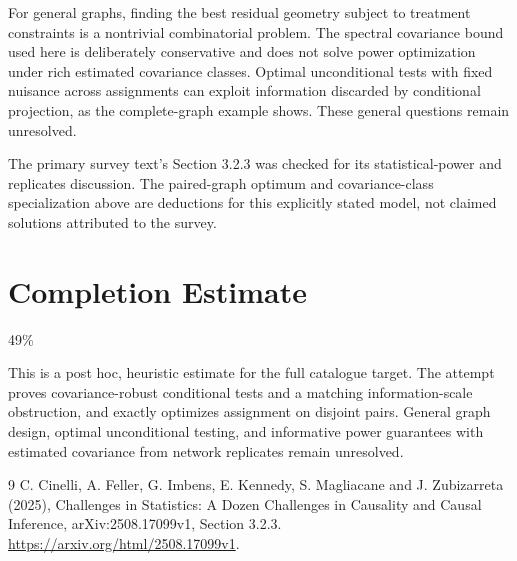 \documentclass[11pt]{article}
\theoremstyle{remark}\newtheorem{remark}[theorem]{Remark}
\begin{document}
For general graphs, finding the best residual geometry subject to treatment constraints is a nontrivial combinatorial problem. The spectral covariance bound used here is deliberately conservative and does not solve power optimization under rich estimated covariance classes. Optimal unconditional tests with fixed nuisance across assignments can exploit information discarded by conditional projection, as the complete-graph example shows. These general questions remain unresolved.

The primary survey text's Section 3.2.3 was checked for its statistical-power and replicates discussion. The paired-graph optimum and covariance-class specialization above are deductions for this explicitly stated model, not claimed solutions attributed to the survey.

\section{Completion Estimate}
49\%

This is a post hoc, heuristic estimate for the full catalogue target.
The attempt proves covariance-robust conditional tests and a matching information-scale obstruction, and exactly optimizes assignment on disjoint pairs. General graph design, optimal unconditional testing, and informative power guarantees with estimated covariance from network replicates remain unresolved.

\begin{thebibliography}{9}
 C. Cinelli, A. Feller, G. Imbens, E. Kennedy, S. Magliacane and J. Zubizarreta (2025), Challenges in Statistics: A Dozen Challenges in Causality and Causal Inference, arXiv:2508.17099v1, Section 3.2.3. \url{https://arxiv.org/html/2508.17099v1}.
\end{thebibliography}
\end{document}
